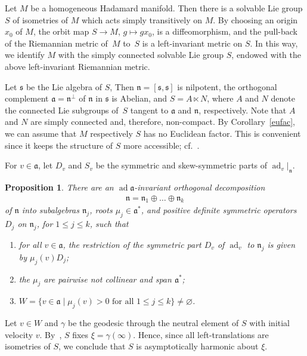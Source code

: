 \documentclass[10pt,a4paper]{amsart}
\numberwithin{equation}{section}
\newtheorem{Proposition}[Theorem]{Proposition}
\DeclareMathOperator{\ad}{ad}
\begin{document}
Let $M$ be a homogeneous Hadamard manifold.
Then there is a solvable Lie group $S$ of isometries of $M$ which acts simply transitively on $M$.
By choosing an origin $x_0$ of $M$,
the orbit map $S\to M$, $g\mapsto gx_0$, is a diffeomorphism,
and the pull-back of the Riemannian metric of~$M$ to~$S$ is a left-invariant metric on $S$.
In this way, we identify $M$ with the simply connected solvable Lie group $S$,
endowed with the above left-invariant Riemannian metric.

Let $\mathfrak s$ be the Lie algebra of $S$,
Then $\mathfrak n=[\mathfrak s, \mathfrak s]$ is nilpotent,
the orthogonal complement $\mathfrak a=\mathfrak n^\perp$ of $\mathfrak n$ in $\mathfrak s$ is Abelian,
and $S=A\ltimes N$,
where $A$ and $N$ denote the connected Lie subgroups of~$S$ tangent to $\mathfrak a$ and $\mathfrak n$,
respectively.
Note that $A$ and $N$ are simply connected and, therefore, non-compact.
By Corollary~\ref{eufac}, we can assume that $M$ respectively $S$ has no Euclidean factor.
This is convenient since it keeps the structure of $S$ more accessible; cf.~\cite[Section~1]{Wolter91}.

For $v\in\mathfrak a$,
let $D_v$ and $S_v$ be the symmetric and skew-symmetric parts of $\ad_v|_{\mathfrak n}$.

\begin{Proposition}%
There are an $\ad\mathfrak a$-invariant orthogonal decomposition
\begin{align*}
	\mathfrak n = \mathfrak n_1 \oplus\dots\oplus \mathfrak n_k
\end{align*}
 of $\mathfrak n$ into subalgebras $\mathfrak n_j$, \emph{roots} $\mu_j\in\mathfrak a^*$,
 and positive definite symmetric operators $D_j$ on $\mathfrak n_j$, for $1\le j\le k$, such that
\begin{enumerate}[label={\rm (\arabic*)}]\itemsep=0pt
\item\label{hh1}
for all $v\in\mathfrak a$, the restriction of the symmetric part $D_v$ of $\ad_v$ to $\mathfrak n_j$
is given by $\mu_j(v)D_j$;
\item%
the $\mu_j$ are pairwise not collinear and span $\mathfrak a^*$;
\item%
$W=\{v\in\mathfrak a \mid \text{$\mu_j(v)>0$ for all $1\le j\le k$} \}\ne\varnothing$.
\end{enumerate}
\end{Proposition}

Let $v\in W$ and $\gamma$ be the geodesic through the neutral element of $S$ with initial velocity $v$.
By~\cite[Proposition~3.3]{Wolter91}, $S$ fixes $\xi=\gamma(\infty)$.
Hence, since all left-translations are isometries of $S$, we conclude that $S$ is asymptotically harmonic about $\xi$.
\end{document}
